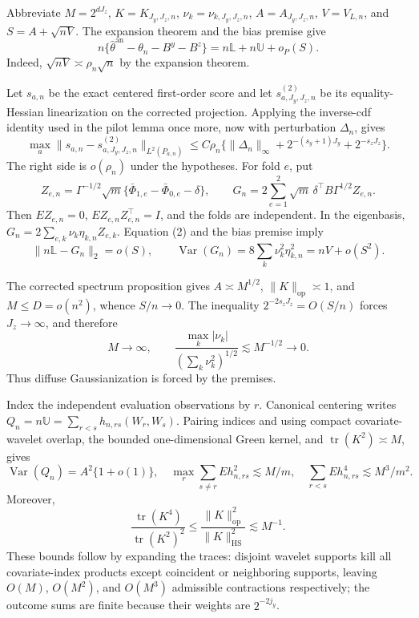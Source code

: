 Abbreviate \(M=2^{dJ_z}\), \(K=K_{J_y,J_z,n}\), \(\nu_k=\nu_{k,J_y,J_z,n}\), \(A=A_{J_y,J_z,n}\), \(V=V_{L,n}\), and \(S=A+\sqrt{nV}\). The expansion theorem and the bias premise give
\[
n\{\widehat\theta^{\mathrm{an}}-\theta_n-B^y-B^z\}=n\mathbb L+n\mathbb U+o_P(S). \tag{1}
\]
Indeed, \(\sqrt{nV}\asymp\rho_n\sqrt n\) by the expansion theorem.

Let \(s_{a,n}\) be the exact centered first-order score and let \(s^{(2)}_{a,J_y,J_z,n}\) be its equality-Hessian linearization on the corrected projection. Applying the inverse-cdf identity used in the pilot lemma once more, now with perturbation \(\Delta_n\), gives
\[
\max_a\|s_{a,n}-s^{(2)}_{a,J_y,J_z,n}\|_{L^2(P_{a,n})}
\le C\rho_n\{\|\Delta_n\|_\infty+2^{-(s_y+1)J_y}+2^{-s_zJ_z}\}.   \tag{2}
\]
The right side is \(o(\rho_n)\) under the hypotheses. For fold \(e\), put
\[
Z_{e,n}=\Gamma^{-1/2}\sqrt m\{\bar\Phi_{1,e}-\bar\Phi_{0,e}-\delta\},
\qquad
G_n=2\sum_{e=1}^2\sqrt m\,\delta^\top B\Gamma^{1/2}Z_{e,n}.          \tag{3}
\]
Then \(EZ_{e,n}=0\), \(E Z_{e,n}Z_{e,n}^\top=I\), and the folds are independent. In the eigenbasis, \(G_n=2\sum_{e,k}\nu_k\eta_{k,n}Z_{e,k}\). Equation (2) and the bias premise imply
\[
\|n\mathbb L-G_n\|_2=o(S),
\qquad \operatorname{Var}(G_n)=8\sum_k\nu_k^2\eta_{k,n}^2=nV+o(S^2). \tag{4}
\]

The corrected spectrum proposition gives \(A\asymp M^{1/2}\), \(\|K\|_{\mathrm{op}}\asymp1\), and \(M\le D=o(n^2)\), whence \(S/n\to0\). The inequality \(2^{-2s_zJ_z}=O(S/n)\) forces \(J_z\to\infty\), and therefore
\[
M\to\infty,
\qquad \frac{\max_k|\nu_k|}{(\sum_k\nu_k^2)^{1/2}}\lesssim M^{-1/2}\to0. \tag{5}
\]
Thus diffuse Gaussianization is forced by the premises.

Index the independent evaluation observations by \(r\). Canonical centering writes \(Q_n=n\mathbb U=\sum_{r<s}h_{n,rs}(W_r,W_s)\). Pairing indices and using compact covariate-wavelet overlap, the bounded one-dimensional Green kernel, and \(\operatorname{tr}(K^2)\asymp M\), gives
\[
\operatorname{Var}(Q_n)=A^2\{1+o(1)\},
\quad \max_r\sum_{s\ne r}Eh_{n,rs}^2\lesssim M/m,
\quad \sum_{r<s}Eh_{n,rs}^4\lesssim M^3/m^2.                         \tag{6}
\]
Moreover,
\[
\frac{\operatorname{tr}(K^4)}{\operatorname{tr}(K^2)^2}
\le\frac{\|K\|_{\mathrm{op}}^2}{\|K\|_{\mathrm{HS}}^2}\lesssim M^{-1}. \tag{7}
\]
These bounds follow by expanding the traces: disjoint wavelet supports kill all covariate-index products except coincident or neighboring supports, leaving \(O(M)\), \(O(M^2)\), and \(O(M^3)\) admissible contractions respectively; the outcome sums are finite because their weights are \(2^{-2j_y}\).

